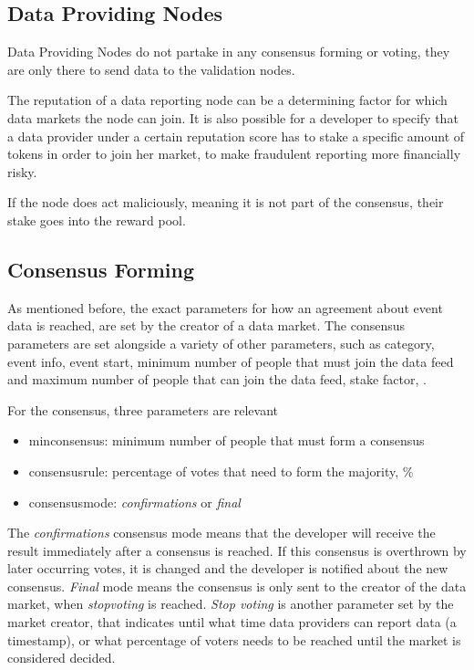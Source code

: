 \subsection*{Data Providing Nodes}
Data Providing Nodes do not partake in any consensus forming or voting, they are only there to send data to the validation nodes.

The reputation of a data reporting node can be a determining factor for which data markets the node can join. It is also possible for a developer to specify that a data provider under a certain reputation score has to stake a specific amount of tokens in order to join her market, to make fraudulent reporting more financially risky.

If the node does act maliciously, meaning it is not part of the consensus, their stake goes into the reward pool.

\subsection*{Consensus Forming}
As mentioned before, the exact parameters for how an agreement about event data is reached, are set by the creator of a data market. The consensus parameters are set alongside a variety of other parameters, such as category, event info, event start, minimum number of people that must join the data feed and maximum number of people that can join the data feed, stake factor, \etc.

For the consensus, three parameters are relevant\cite{veritywhitepaper}
\begin{itemize}
\item min\textunderscore consensus: minimum number of people that must form a consensus
\item consensus\textunderscore rule: percentage of votes that need to form the majority, \%
\item consensus\textunderscore mode: \emph{confirmations} or \emph{final}
\end{itemize}
The \emph{confirmations} consensus mode means that the developer will receive the result immediately after a consensus is reached. If this consensus is overthrown by later occurring votes, it is changed and the developer is notified about the new consensus. \emph{Final} mode means the consensus is only sent to the creator of the data market, when \emph{stop\textunderscore voting} is reached. \emph{Stop voting} is another parameter set by the market creator, that indicates until what time data providers can report data (a timestamp), or what percentage of voters needs to be reached until the market is considered decided.

